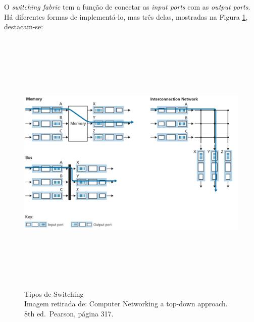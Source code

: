 O \emph{switching fabric} tem a função de conectar as \emph{input ports}
com as \emph{output ports}. Há diferentes formas de implementá-lo, mas
três delas, mostradas na Figura \ref{Tipos de Switching}, destacam-se:


\begin{figure}[h!]
\centering
\includegraphics[keepaspectratio, width=16cm, height=13cm]{imagens/14/14 - switching.png}
\caption{Tipos de Switching \\
Imagem retirada de: Computer Networking a top-down approach. 8th
ed.~Pearson, página 317. \\}
\label{Tipos de Switching}
\end{figure}



